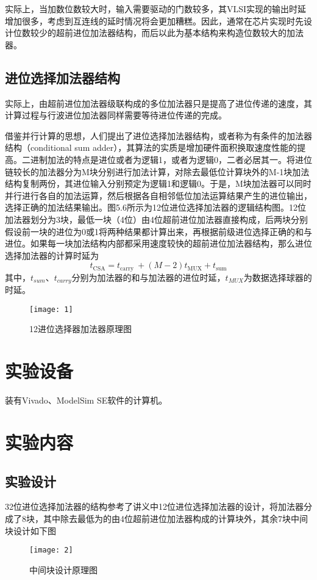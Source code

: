 \documentclass{../source/Experiment}
\begin{document}
实际上，当加数位数较大时，输入需要驱动的门数较多，其VLSI实现的输出时延增加很多，考虑到互连线的延时情况将会更加糟糕。因此，通常在芯片实现时先设计位数较少的超前进位加法器结构，而后以此为基本结构来构造位数较大的加法器。
\subsection{进位选择加法器结构}

实际上，由超前进位加法器级联构成的多位加法器只是提高了进位传递的速度，其计算过程与行波进位加法器同样需要等待进位传递的完成。

借鉴并行计算的思想，人们提出了进位选择加法器结构，或者称为有条件的加法器结构（conditional sum adder），其算法的实质是增加硬件面积换取速度性能的提高。二进制加法的特点是进位或者为逻辑1，或者为逻辑0，二者必居其一。将进位链较长的加法器分为M块分别进行加法计算，对除去最低位计算块外的M-1块加法结构复制两份，其进位输入分别预定为逻辑1和逻辑0。于是，M块加法器可以同时并行进行各自的加法运算，然后根据各自相邻低位加法运算结果产生的进位输出，选择正确的加法结果输出。图5.6所示为12位进位选择加法器的逻辑结构图。12位加法器划分为3块，最低一块（4位）由4位超前进位加法器直接构成，后两块分别假设前一块的进位为0或1将两种结果都计算出来，再根据前级进位选择正确的和与进位。如果每一块加法结构内部都采用速度较快的超前进位加法器结构，那么进位选择加法器的计算时延为
$$
    t_{\mathrm{CSA}}=t_{\text {carry }}+(M-2) t_{\mathrm{MUX}}+t_{\mathrm{sum}}
$$
其中，$t_{sum}$、$t_{carry}$分别为加法器的和与加法器的进位时延，$t_{MUX}$为数据选择球器的时延。

\begin{figure}[H]
    \centering
    \texttt{[image: 1]}
    \caption{12进位选择器加法器原理图}
\end{figure}

\section{实验设备}
装有Vivado、ModelSim SE软件的计算机。
\section{实验内容}
\subsection{实验设计}
32位进位选择加法器的结构参考了讲义中12位进位选择加法器的设计，将加法器分成了8块，其中除去最低为的由4位超前进位加法器构成的计算块外，其余7块中间块设计如下图
\begin{figure}[H]
    \centering
    \texttt{[image: 2]}
    \caption{中间块设计原理图}
\end{figure}
\end{document}
